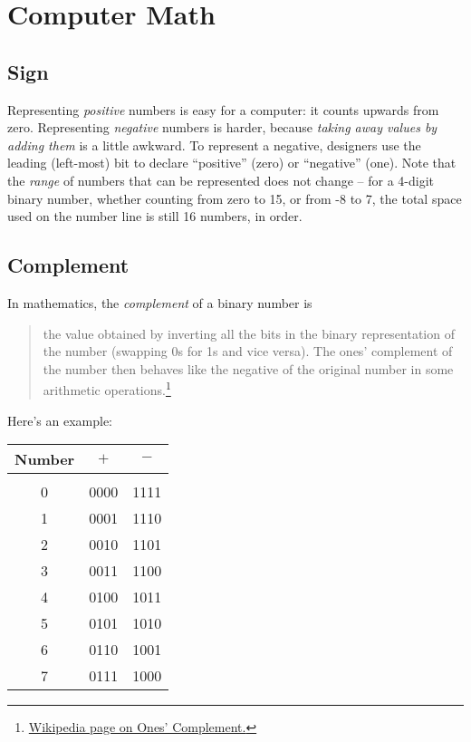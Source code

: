 \section{Computer Math}


\subsection*{Sign}

Representing \emph{positive} numbers is easy for a computer: it counts upwards from zero. Representing \emph{negative} numbers is harder, because \emph{taking away values by adding them} is a little awkward. To represent a negative, designers use the leading (left-most) bit to declare ``positive'' (zero) or ``negative'' (one). Note that the \emph{range} of numbers that can be represented does not change -- for a 4-digit binary number, whether counting from zero to 15, or from -8 to 7, the total space used on the number line is still 16 numbers, in order.


\subsection*{Complement}

In mathematics, the \emph{complement} of a binary number is 
\begin{quote}
the value obtained by inverting all the bits in the binary representation of the number (swapping 0s for 1s and vice versa). The ones' complement of the number then behaves like the negative of the original number in some arithmetic operations.\footnote{{\color{webblue}\href{https://en.wikipedia.org/wiki/Ones\%27_complement}{Wikipedia page on Ones' Complement.}}}
\end{quote}

Here's an example:

\bigskip

\begin{tabular} {c c c}
 Number &  $+$   &   $-$ \\[\sep]
 \hline\\[\negsep]
 0  &  0000 &  1111  \\ 
 1  & 0001  & 1110  \\
 2  & 0010  & 1101\\
 3  & 0011  & 1100\\
 4  & 0100  & 1011\\
 5  & 0101  & 1010\\
 6  & 0110  & 1001\\
 7  & 0111  & 1000\\
 \hline

\end{tabular}

